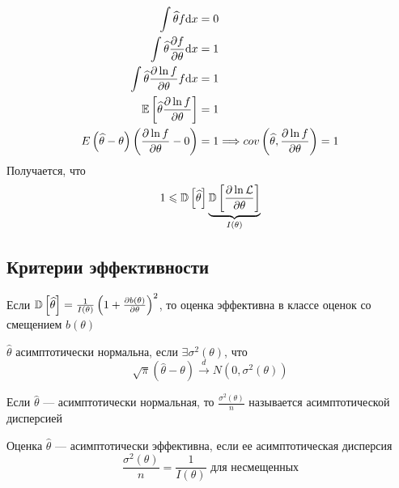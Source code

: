 \documentclass[a4paper, 10pt]{article}
\begin{document}
\begin{equation*}
    \begin{aligned}
        \int\widehat{\theta}f\text{d}x&=0\\
        \int\widehat{\theta}\frac{\partial f}{\partial\theta}\text{d}x&=1\\
        \int\widehat{\theta}\frac{\partial\ln f}{\partial\theta}f\text{d}x&=1\\
        \mathbb{E}\left[\widehat{\theta}\frac{\partial \ln f}{\partial\theta}\right]&=1\\
        E\left(\widehat{\theta}-\theta\right)\left(\frac{\partial \ln f}{\partial\theta}-0\right)&=1\Longrightarrow cov\left(\widehat{\theta},\frac{\partial\ln f}{\partial\theta}\right)=1
    \end{aligned}
\end{equation*}
Получается, что
\begin{equation*}
    1\leqslant\mathbb{D}\left[\widehat{\theta}\right]\underbrace{\mathbb{D}\left[\frac{\partial\ln\mathcal{L}}{\partial\theta}\right]}_{I(\theta)}
\end{equation*}


\subsection{Критерии эффективности}
Если $ \mathbb{D}\left[\widehat{\theta}\right]=\frac{1}{I(\theta)}\left(1+\frac{\partial b(\theta)}{\partial\theta}\right)^2$, то оценка эффективна в классе оценок со смещением $b(\theta)$

 $\widehat{\theta}$ асимптотически нормальна, если $\exists\sigma^2(\theta)$, что 
\begin{equation*}
    \sqrt{\pi}(\widehat{\theta}-\theta)\overset{d}{\longrightarrow} N(0,\sigma^2(\theta))
\end{equation*}

 Если $\widehat{\theta}$ — асимптотически нормальная, то $\frac{\sigma^2(\theta)}{n}$ называется асимптотической дисперсией

 Оценка $\widehat{\theta}$ — асимптотически эффективна, если ее асимптотическая дисперсия 
\begin{equation*}
    \frac{\sigma^2(\theta)}{n}=\frac{1}{I(\theta)}\text{ для несмещенных}
\end{equation*}
\end{document}
